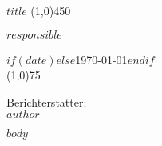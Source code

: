 \documentclass[$fontsize$,a4paper]{scrartcl}
\begin{document}
\begin{titlepage}
\vspace*{5cm}
  \begin{center}    
    \huge{\textbf{$title$}}
    \line(1,0){450}

    \large{\textbf{$responsible$}}    
  \end{center}
  \begin{flushright}
    \vspace{9cm}
    {\small
   $if(date)$$else$\today$endif$ \\
    \line(1,0){75}
    
    Berichterstatter:\\ 
    $author$}
  \end{flushright}
\end{titlepage}



$body$

% 

\begin{center}
\textasteriskcentered{}
\end{center}
  
\end{document}
